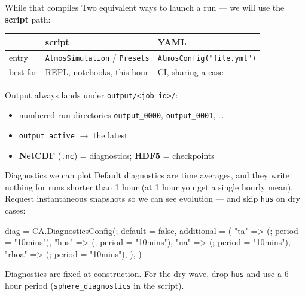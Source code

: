 \documentclass[aspectratio=169,11pt]{beamer}
\newcommand{\cta}[1]{{\color{climateal}\textbf{#1}}}
\begin{document}
\begin{frame}{While that compiles}
Two equivalent ways to launch a run --- we will use the \cta{script} path:
\vspace{0.4em}
\begin{center}
\begin{tabular}{lll}
  \toprule
   & \textbf{script} & \textbf{YAML} \\
  \midrule
  entry & \texttt{AtmosSimulation} / \texttt{Presets} & \texttt{AtmosConfig("file.yml")} \\
  best for & REPL, notebooks, this hour & CI, sharing a case \\
  \bottomrule
\end{tabular}
\end{center}
\vspace{0.8em}
Output always lands under \texttt{output/<job\_id>/}:
\begin{itemize}
  \item numbered run directories \texttt{output\_0000}, \texttt{output\_0001}, \ldots
  \item \texttt{output\_active} $\to$ the latest
  \item \textbf{NetCDF} (\texttt{.nc}) = diagnostics; \textbf{HDF5} = checkpoints
\end{itemize}
\end{frame}

\begin{frame}[fragile]{Diagnostics we can plot}
Default diagnostics are time averages, and they write nothing for runs
shorter than 1 hour (at 1 hour you get a single hourly mean). Request
instantaneous snapshots so we can see evolution --- and skip \texttt{hus}
on dry cases:
\vspace{0.3em}
\begin{semiverbatim}
diag = CA.DiagnosticsConfig(;
    default = false,
    additional = (
        "ta"   => (; period = "10mins"),
        "hus"  => (; period = "10mins"),
        "ua"   => (; period = "10mins"),
        "rhoa" => (; period = "10mins"),
    ),
)
\end{semiverbatim}
\small
Diagnostics are fixed at construction. For the dry wave, drop \texttt{hus}
and use a 6-hour period (\texttt{sphere\_diagnostics} in the script).
\end{frame}
\end{document}
